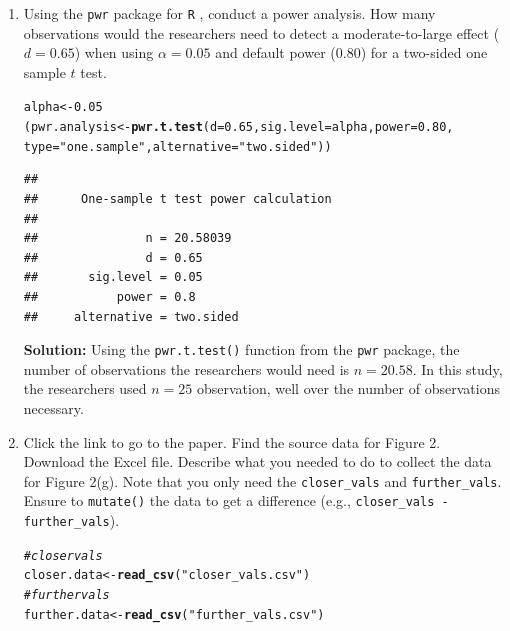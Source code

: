\documentclass{article}\usepackage[]{graphicx}\usepackage[]{xcolor}
\makeatletter
\newcommand{\hlnum}[1]{\textcolor[rgb]{0.686,0.059,0.569}{#1}}%
\newcommand{\hlsng}[1]{\textcolor[rgb]{0.192,0.494,0.8}{#1}}%
\newcommand{\hlcom}[1]{\textcolor[rgb]{0.678,0.584,0.686}{\textit{#1}}}%
\newcommand{\hldef}[1]{\textcolor[rgb]{0.345,0.345,0.345}{#1}}%
\newcommand{\hlkwb}[1]{\textcolor[rgb]{0.69,0.353,0.396}{#1}}%
\newcommand{\hlkwc}[1]{\textcolor[rgb]{0.333,0.667,0.333}{#1}}%
\newcommand{\hlkwd}[1]{\textcolor[rgb]{0.737,0.353,0.396}{\textbf{#1}}}%
\newenvironment{kframe}{%
 \def\at@end@of@kframe{}%
 \ifinner\ifhmode%
  \def\at@end@of@kframe{\end{minipage}}%
  \begin{minipage}{\columnwidth}%
 \fi\fi%
 \def\FrameCommand##1{\hskip\@totalleftmargin \hskip-\fboxsep
 \colorbox{shadecolor}{##1}\hskip-\fboxsep
     \hskip-\linewidth \hskip-\@totalleftmargin \hskip\columnwidth}%
 \MakeFramed {\advance\hsize-\width
   \@totalleftmargin\z@ \linewidth\hsize
   \@setminipage}}%
 {\par\unskip\endMakeFramed%
 \at@end@of@kframe}
\newenvironment{knitrout}{}{} %
\makeatother
\begin{document}
\begin{enumerate}
\item Using the \texttt{pwr} package for \texttt{R} \citep{pwr},
conduct a power analysis. How many observations would the researchers 
need to detect a moderate-to-large effect ($d=0.65$) when using 
$\alpha=0.05$ and default power (0.80) for a two-sided one sample 
$t$ test. \\
\begin{knitrout}
\color{fgcolor}\begin{kframe}
\begin{alltt}
\hldef{alpha} \hlkwb{<-} \hlnum{0.05}
\hldef{(pwr.analysis} \hlkwb{<-} \hlkwd{pwr.t.test}\hldef{(}\hlkwc{d}\hldef{=}\hlnum{0.65}\hldef{,} \hlkwc{sig.level} \hldef{= alpha,} \hlkwc{power} \hldef{=} \hlnum{0.80}\hldef{,}
                            \hlkwc{type} \hldef{=} \hlsng{"one.sample"}\hldef{,} \hlkwc{alternative} \hldef{=} \hlsng{"two.sided"}\hldef{))}
\end{alltt}
\begin{verbatim}
## 
##      One-sample t test power calculation 
## 
##               n = 20.58039
##               d = 0.65
##       sig.level = 0.05
##           power = 0.8
##     alternative = two.sided
\end{verbatim}
\end{kframe}
\end{knitrout}
\textbf{Solution:} Using the \verb|pwr.t.test()| function from the \texttt{pwr} package, the number of observations the researchers would need is $n = 20.58$. In this study, the researchers used $n=25$ observation, well over the number of observations necessary.
\item Click the link to go to the paper. Find the source data for 
Figure 2. Download the Excel file. Describe what you needed to
do to collect the data for Figure 2(g). Note that you only need the 
\texttt{closer\_vals} and \texttt{further\_vals}. Ensure to 
\texttt{mutate()} the data to get a difference 
(e.g., \texttt{closer\_vals - further\_vals}).
\begin{knitrout}
\color{fgcolor}\begin{kframe}
\begin{alltt}
\hlcom{# closer vals}
\hldef{closer.data} \hlkwb{<-} \hlkwd{read_csv}\hldef{(}\hlsng{"closer_vals.csv"}\hldef{)}
\hlcom{# further vals}
\hldef{further.data} \hlkwb{<-} \hlkwd{read_csv}\hldef{(}\hlsng{"further_vals.csv"}\hldef{)}


\end{alltt}
\end{kframe}
\end{knitrout}
\end{enumerate}
\end{document}
